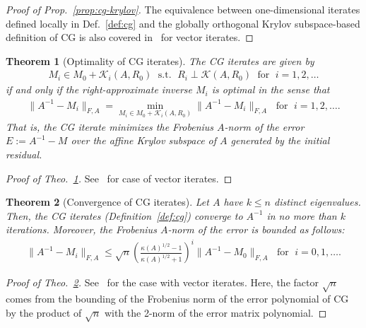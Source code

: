 \documentclass[numbers,webpdf,imanum]{ima-authoring-template}%
\theoremstyle{thmstyletwo}%
\newtheorem{theorem}{Theorem}%
\numberwithin{equation}{section}
\begin{document}
\begin{proof}[Proof of Prop.~\ref{prop:cg-krylov}]
The equivalence between one-dimensional iterates defined locally in Def.~\ref{def:cg} and the globally orthogonal Krylov subspace-based definition of CG is also covered in~\cite{ciaramella_iterative_2022} for vector iterates.
\end{proof}

\begin{theorem}[Optimality of CG iterates]\label{theo:cg-optimal}
The CG iterates are given by
\begin{align}
M_i\in M_0+\mathcal{K}_i(A,R_0)
\;\text{ s.t. }\;
R_i\perp\mathcal{K}(A,R_0)
\;\text{ for }\;
i=1,2,\dots
\end{align}
if and only if the right-approximate inverse $M_i$ is optimal in the sense that
\begin{align}
\|A^{-1}-M_i\|_{F,A}=
\underset{M_i\in M_0+\mathcal{K}_i(A,R_0)}{\min}\|A^{-1}-M_i\|_{F,A}
\;\text{ for }\;
i=1,2,\dots.
\end{align}
That is, the CG iterate minimizes the Frobenius $A$-norm of the error $E:=A^{-1}-M$ over the affine Krylov subspace of $A$ generated by the initial residual.
\end{theorem}
\begin{proof}[Proof of Theo.~\ref{theo:cg-optimal}]
See~\cite{Saad2003SparseBook} for case of vector iterates.
\end{proof}

\begin{theorem}[Convergence of CG iterates]\label{theo:cg-bound}
Let $A$ have $k\leq n$ distinct eigenvalues.
Then, the CG iterates (Definition~\ref{def:cg}) converge to $A^{-1}$ in no more than $k$ iterations.
Moreover, the Frobenius $A$-norm of the error is bounded as follows:
\begin{align}\label{eq:732}
\|A^{-1}-M_i\|_{F,A}
\leq
\sqrt{n}
\left(
\frac{\kappa(A)^{1/2}-1}{\kappa(A)^{1/2}+1}
\right)^i
\|A^{-1}-M_0\|_{F,A}
\;\text{ for }\;
i=0,1,\dots.
\end{align}
\end{theorem}
\begin{proof}[Proof of Theo.~\ref{theo:cg-bound}]
See~\cite{ciaramella_iterative_2022} for the case with vector iterates. Here, the factor $\sqrt{n}$ comes from the bounding of the Frobenius norm of the error polynomial of CG by the product of $\sqrt{n}$ with the 2-norm of the error matrix polynomial.
\end{proof}
\end{document}
